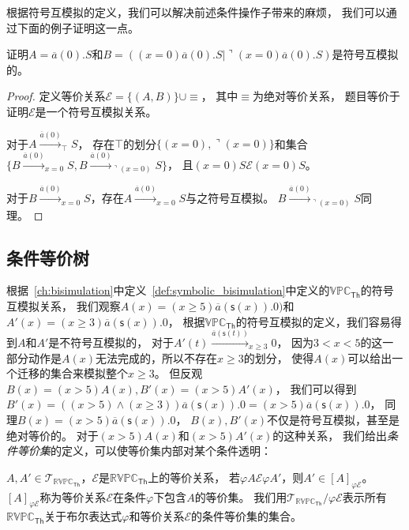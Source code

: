    根据符号互模拟的定义，我们可以解决前述条件操作子带来的麻烦，
   我们可以通过下面的例子证明这一点。
   \begin{example}
      证明$A=\overline{a}(0).S$和$B=((x=0) \overline{a}(0).S|\urcorner (x=0) \overline{a}(0).S)$是符号互模拟的。
   \end{example}
   \begin{proof}
      定义等价关系$\mathcal{E}=\{(A,B)\}\cup \equiv$，
      其中$\equiv$为绝对等价关系，
      题目等价于证明$\mathcal{E}$是一个符号互模拟关系。

      对于$A\stackrel{\overline{a}(0)}{\rightarrow}_{\top} S$，
      存在$\top$的划分$\{(x=0),\urcorner(x=0)\}$和集合
      $\{B\stackrel{\overline{a}(0)}{\longrightarrow}_{x=0}S, B\stackrel{\overline{a}(0)}{\longrightarrow}_{\urcorner(x=0)}S\}$，
      且$(x=0)S\mathcal{E}(x=0)S$。

      对于$B\stackrel{\overline{a}(0)}{\longrightarrow}_{x=0}S$，存在$A\stackrel{\overline{a}(0)}{\longrightarrow}_{x=0}S$与之符号互模拟。
      $B\stackrel{\overline{a}(0)}{\longrightarrow}_{\urcorner(x=0)}S$同理。
   \end{proof}

   \subsection{条件等价树}

   根据~\ref{ch:bisimulation}中定义~\ref{def:symbolic_bisimulation}中定义的$\mathbb{VPC}_{\mathsf{Th}}$的符号互模拟关系，
   我们观察$A(x)=(x\geq 5)\overline{a}(\mathsf{s}(x)).0)$和$A'(x)=(x\geq 3)\overline{a}(\mathsf{s}(x)).0$，
   根据$\mathbb{VPC}_\mathsf{Th}$的符号互模拟的定义，我们容易得到$A$和$A'$是不符号互模拟的，
   对于$A'(t)\stackrel{\overline{a}(\mathsf{s}(t))}{\longrightarrow}_{x\geq 3} 0$，
   因为$3<x<5$的这一部分动作是$A(x)$无法完成的，所以不存在$x\geq 3$的划分，
   使得$A(x)$可以给出一个迁移的集合来模拟整个$x\geq 3$。
   但反观$B(x)=(x>5)A(x),B'(x)=(x>5)A'(x)$，
   我们可以得到$B'(x)=((x>5)\wedge(x\geq 3))\overline{a}(\mathsf{s}(x)).0=(x>5)\overline{a}(\mathsf{s}(x)).0$，
   同理$B(x)=(x>5)\overline{a}(\mathsf{s}(x)).0$，
   $B(x),B'(x)$不仅是符号互模拟，甚至是绝对等价的。
   对于$(x>5)A(x)$和$(x>5)A'(x)$的这种关系，
   我们给出\textit{条件等价集}的定义，可以使等价集内部对某个条件透明：

   \begin{definition}[条件等价集]
     $A,A'\in \mathcal{T}_{\mathbb{RVPC}_{\mathsf{Th}}}$，$\mathcal{E}$是$\mathbb{RVPC}_{\mathsf{Th}}$上的等价关系，
     若$\varphi A \mathcal{E} \varphi A'$，则$A'\in [A]_{\varphi \mathcal{E}}$。
     $[A]_{\varphi \mathcal{E}}$称为等价关系$\mathcal{E}$在条件$\varphi$下包含$A$的等价集。 
     我们用$\mathcal{T}_{\mathbb{RVPC}_{\mathsf{Th}}}/\varphi \mathcal{E}$表示所有$\mathbb{RVPC}_{\mathsf{Th}}$关于布尔表达式$\varphi$和等价关系$\mathcal{E}$的条件等价集的集合。 
   \end{definition} 

